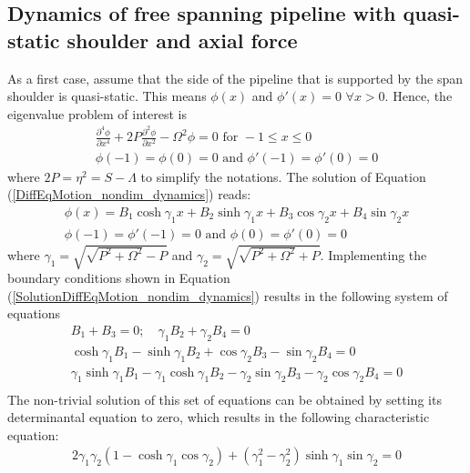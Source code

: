 \documentclass[3p,doublespacing,authoryear,11pt]{elsarticle} %
\begin{document}
\subsection{Dynamics of free spanning pipeline with quasi-static shoulder and axial force}
As a first case, assume that the side of the pipeline that is supported by the span shoulder is quasi-static. This means $\phi (x)$ and $\phi' (x) = 0$ $\forall x > 0$. Hence, the eigenvalue problem of interest is  
 \begin{equation}\label{DiffEqMotion_nondim_dynamics}
 \begin{array}{l } 
\displaystyle  \frac{\partial^4 \phi}{\partial x^4} + 2P \frac{\partial^2 \phi}{\partial x^2}  - \Omega^2 \phi  =  0  \text{ for } -1 \le x \le 0 \\ 
\displaystyle \phi (-1) = \phi (0) =0 \text{ and }  \phi' (-1) = \phi' (0) =0 
  \end{array}  
\end{equation}
where $2P = \eta^2 = S-\Lambda$ to simplify the notations. The solution of Equation (\ref{DiffEqMotion_nondim_dynamics}) reads: 
 \begin{equation}\label{SolutionDiffEqMotion_nondim_dynamics}
 \begin{array}{l } 
\displaystyle  \phi(x) = B_1 \cosh \gamma_1 x + B_2 \sinh \gamma_1 x + B_3 \cos \gamma_2 x + B_4 \sin \gamma_2 x \\
\displaystyle \phi (-1) = \phi' (-1) =0 \text{ and }  \phi (0) = \phi' (0) =0 
  \end{array}  
\end{equation}
where $\gamma_1 = \sqrt{\sqrt{P^2 + \Omega^2}-P}$ and $ \gamma_2 = \sqrt{\sqrt{P^2 + \Omega^2}+P}$. Implementing the boundary conditions shown in Equation (\ref{SolutionDiffEqMotion_nondim_dynamics}) results in the following system of equations 
 \begin{equation}\label{NonTrivialSolution}
 \begin{array}{l } 
\displaystyle  B_1 +  B_3 =0; \quad  \gamma_1 B_2 +  \gamma_2 B_4 =0 \\
\displaystyle \cosh \gamma_1 B_1   -  \sinh \gamma_1 B_2 +  \cos \gamma_2 B_3  - \sin \gamma_2 B_4 =0   \\
\displaystyle  \gamma_1  \sinh \gamma_1 B_1 - \gamma_1 \cosh \gamma_1 B_2  - \gamma_2  \sin \gamma_2 B_3  - \gamma_2  \cos \gamma_2 B_4 =0  \\
  \end{array}  
\end{equation}
The non-trivial solution of this set of equations can be obtained by setting its determinantal equation to zero, which results in the following characteristic equation:
 \begin{equation}\label{NonTrivialSolution-1}
 \begin{array}{l } 
\displaystyle  2\gamma_1\gamma_2\left(1-\cosh \gamma_1 \cos \gamma_2\right)+\left(\gamma_1^2-\gamma_2^2\right)\sinh \gamma_1 \sin \gamma_2 = 0
  \end{array}  
\end{equation}
\end{document}
